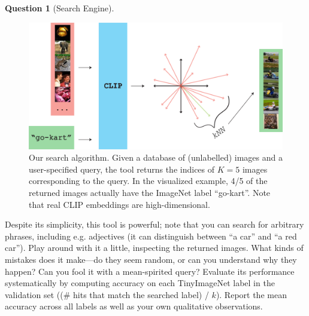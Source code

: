 \documentclass{article}
\theoremstyle{definition}
\newtheorem{subquestion}{Question}[question]
\begin{document}
\begin{subquestion}[Search Engine]
\begin{figure}[h!]
    \centering
    \includegraphics[width=\textwidth]{hw0_fig.png}
    \caption{Our search algorithm. Given a database of (unlabelled) images and a user-specified query, the tool returns the indices of $K=5$ images corresponding to the query. In the visualized example, 4/5 of the returned images actually have the ImageNet label ``go-kart''. Note that real CLIP embeddings are high-dimensional.}
    \label{fig:search}
\end{figure}

Despite its simplicity, this tool is powerful; note that you can search for arbitrary phrases, including e.g. adjectives (it can distinguish between ``a car'' and ``a red car''). Play around with it a little, inspecting the returned images. What kinds of mistakes does it make---do they seem random, or can you understand why they happen? Can you fool it with a mean-spirited query? Evaluate its performance systematically by computing accuracy on each TinyImageNet label in the validation set ((\# hits that match the searched label) / $k$). Report the mean accuracy across all labels as well as your own qualitative observations.
\end{subquestion}
\end{document}
